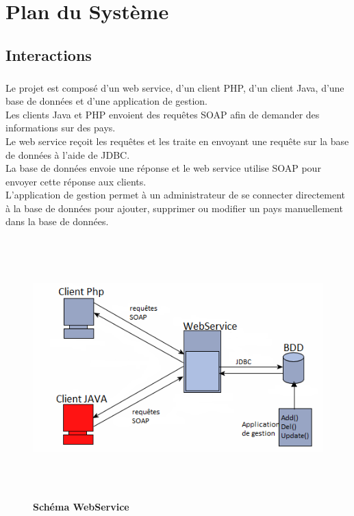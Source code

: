 \chapter{Plan du Système}
\section{Interactions}
\paragraph{} Le projet est composé d'un web service, d'un client PHP, d'un client Java, d'une base de données et d'une application de gestion.\\
Les clients Java et PHP envoient des requêtes SOAP afin de demander des informations sur des pays.\\
Le web service reçoit les requêtes et les traite en envoyant une requête sur la base de données à l'aide de JDBC.\\
La base de données envoie une réponse et le web service utilise SOAP pour envoyer cette réponse aux clients.\\
L'application de gestion permet à un administrateur de se connecter directement à la base de données pour ajouter, supprimer ou modifier un pays manuellement dans la base de données.\\

\vspace{1.0cm}
\begin{figure}[H]
  \centering
    \includegraphics[height= 10cm, width=15cm]{project/images/webservice2}
  \caption{\textbf{Schéma WebService}}
\end{figure}